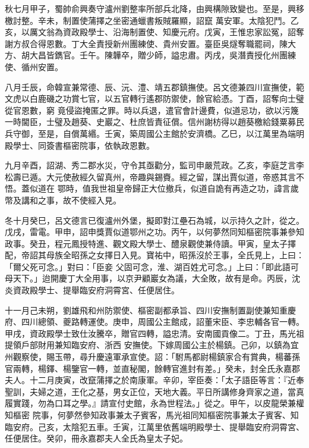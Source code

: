 \begin{pinyinscope}
 秋七月甲子，蜀帥俞興奏守瀘州劉整率所部兵北降，由興構隙致變也。至是，興移檄討整。辛未，制置使蒲擇之坐密通蠟書叛賊羅顯，詔竄
 萬安軍。太陰犯鬥。乙亥，以厲文翁為資政殿學士、沿海制置使、知慶元府。戊寅，王惟忠家訟冤，詔奪謝方叔合得恩數。丁大全責授新州團練使、貴州安置。臺臣吳燧奪職罷祠，陳大方、胡大昌皆鐫官。壬午。陳韡卒，贈少師，謚忠肅。丙戌，吳潛責授化州團練使、循州安置。



 八月壬辰，命韓宣兼常德、辰、沅、澧、靖五郡鎮撫使。呂文德兼四川宣撫使，範文虎以白鹿磯之功賞七官，以五官轉行遙郡防禦使，餘官給憑。丁酉，詔奪向士璧從官恩數，窮
 竟侵盜掩匿之罪。時以兵退，遣官會計邊費，似道忌功，欲以污篾一時閫臣，士璧及趙葵、史巖之、杜庶皆責征償。信州謝枋得以趙葵檄給錢粟募民兵守御，至是，自償萬緡。壬寅，築周國公主館於安濟橋。乙巳，以江萬里為端明殿學士、同簽書樞密院事，依執政恩數。



 九月辛酉，詔湖、秀二郡水災，守令其亟勸分，監司申嚴荒政。乙亥，李庭芝言李松壽已遁。大元使赦經久留真州，帝趣與錫賚。經之留，謀出賈似道，帝惑其言不悟。蓋似道在
 鄂時，值我世祖皇帝歸正大位撤兵，似道自詭有再造之功，諱言歲幣及講和之事，故不使經入見。



 冬十月癸巳，呂文德言已復瀘州外堡，擬即對江壘石為城，以示持久之計，從之。戊戌，雷電。甲申，詔申獎賈似道鄂州之功。丙午，以何夢然同知樞密院事兼參知政事。癸丑，程元鳳授特進、觀文殿大學士、醴泉觀使兼侍讀。甲寅，皇太子擇配，帝詔其母族全昭孫之女擇日入見。寶祐中，昭孫沒於王事，全氏見上，上曰：「爾父死可念。」對曰：「臣妾
 父固可念，淮、湖百姓尤可念。」上曰：「即此語可母天下。」迨開慶丁大全用事，以京尹顧巖女為議，大全敗，故有是命。丙辰，沈炎資政殿學士、提舉臨安府洞霄宮、任便居住。



 十一月己未朔，劉雄飛和州防禦使、樞密副都承旨、四川安撫制置副使兼知重慶府、四川總領、夔路轉運使。庚申，周國公主館成，詔董宋臣、李忠輔各官一轉。甲戌，資政殿學士致仕汝騰卒，贈官四轉，謚忠清。安南國貢像二。丁丑，馬光祖提領戶部財用兼知臨安府、浙西
 安撫使。下嫁周國公主於楊鎮。己卯，以鎮為宜州觀察使，賜玉帶，尋升慶遠軍承宣使。詔：「駙馬都尉楊鎮家合有賞典，楊蕃孫官兩轉，楊鐸、楊鑒官一轉，並直秘閣，餘轉官進封有差。」癸未，封全氏永嘉郡夫人。十二月庚寅，改竄蒲擇之於南康軍。辛卯，宰臣奏：「太子語臣等言：『近奉聖訓，夫婦之道，王化之基，男女正位，天地大義。平日所講修身齊家之道，當真履實踐，勿為口耳之學。』請宣付史館，永為世程法。」從之。甲午，以皮龍榮兼權知樞密
 院事，何夢然參知政事兼太子賓客，馬光祖同知樞密院事兼太子賓客、知臨安府。己亥，太陰犯五車。壬寅，江萬里依舊端明殿學士、提舉臨安府洞霄宮、任便居住。癸卯，冊永嘉郡夫人全氏為皇太子妃。




\end{pinyinscope}
